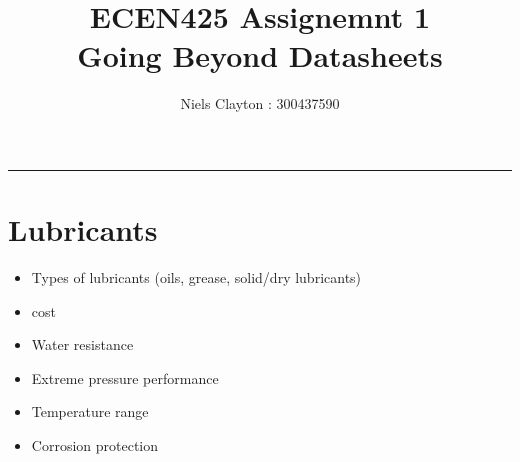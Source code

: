 \documentclass[a4paper,11pt]{article}
\begin{document}
\title{\LARGE{\textbf{ECEN425 Assignemnt 1}\\Going Beyond Datasheets}}
\author{Niels Clayton : 300437590}
\date{}
\maketitle
\hrule

\section*{Lubricants}

\begin{itemize}
    \item Types of lubricants (oils, grease, solid/dry lubricants)
    \item cost 
    \item Water resistance
    \item Extreme pressure performance
    \item Temperature range
    \item Corrosion protection
\end{itemize}
\end{document}
